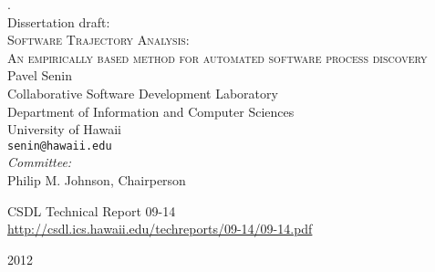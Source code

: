 \begin{titlepage}

\begin{center}

\tiny{.}\\ [1.2cm]

\Large{Dissertation draft:} \\ [0.5cm]
\LARGE{\textsc{Software Trajectory Analysis:}} \\
\LARGE{\textsc{An empirically based method for automated software process discovery}} \\ [0.6cm]

\large{
Pavel Senin \\
Collaborative Software Development Laboratory \\
Department of Information and Computer Sciences \\
University of Hawaii \\
\texttt{senin@hawaii.edu} \\ [1.0cm]


\emph{Committee:} \\
Philip M. Johnson, Chairperson \\
}

\normalsize{
CSDL Technical Report 09-14 \\
\url{http://csdl.ics.hawaii.edu/techreports/09-14/09-14.pdf} \\ [1.5cm]
}

\large{2012}

\end{center}

\end{titlepage}

